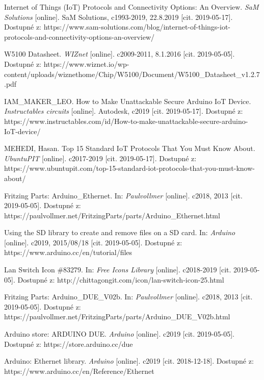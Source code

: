 \renewcommand{\refname}{Reference}
\begin{thebibliography}{30}

  Internet of Things (IoT) Protocols and Connectivity Options: An Overview. \textit{SaM Solutions} [online]. SaM Solutions, c1993-2019, 22.8.2019 [cit. 2019-05-17]. Dostupné z: https://www.sam-solutions.com/blog/internet-of-things-iot-protocols-and-connectivity-options-an-overview/

  W5100 Datasheet. \textit{WIZnet} [online]. c2009-2011, 8.1.2016 [cit. 2019-05-05]. Dostupné z: https://www.wiznet.io/wp-content/uploads/wiznethome/Chip/W5100/Document/W5100\_Datasheet\_v1.2.7.pdf

  IAM\_MAKER\_LEO. How to Make Unattackable Secure Arduino IoT Device. \textit{Instructables circuits} [online]. Autodesk, c2019 [cit. 2019-05-17]. Dostupné z: https://www.instructables.com/id/How-to-make-unattackable-secure-arduino-IoT-device/

MEHEDI, Hasan. Top 15 Standard IoT Protocols That You Must Know About. \textit{UbuntuPIT} [online]. c2017-2019 [cit. 2019-05-17]. Dostupné z: https://www.ubuntupit.com/top-15-standard-iot-protocols-that-you-must-know-about/



Fritzing Parts: Arduino\_Ethernet. In: \textit{Paulvollmer} [online]. c2018, 2013 [cit. 2019-05-05]. Dostupné z: https://paulvollmer.net/FritzingParts/parts/Arduino\_Ethernet.html

Using the SD library to create and remove files on a SD card. In: \textit{Arduino} [online]. c2019, 2015/08/18 [cit. 2019-05-05]. Dostupné z: https://www.arduino.cc/en/tutorial/files

Lan Switch Icon \#83279. In: \textit{Free Icons Library} [online]. c2018-2019 [cit. 2019-05-05]. Dostupné z: http://chittagongit.com/icon/lan-switch-icon-25.html

Fritzing Parts: Arduino\_DUE\_V02b. In: \textit{Paulvollmer} [online]. c2018, 2013 [cit. 2019-05-05]. Dostupné z: https://paulvollmer.net/FritzingParts/parts/Arduino\_DUE\_V02b.html

Arduino store: ARDUINO DUE. \textit{Arduino} [online]. c2019 [cit. 2019-05-05]. Dostupné z: https://store.arduino.cc/due


Arduino: Ethernet library. \textit{Arduino} [online]. c2019 [cit. 2018-12-18]. Dostupné z: https://www.arduino.cc/en/Reference/Ethernet


\end{thebibliography}
